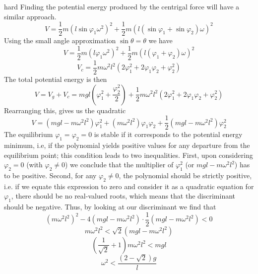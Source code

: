 \begin{solution}{hard}
Finding the potential energy produced by the centrigal force will have a similar approach.
\[V=\frac{1}{2}m(l\sin\varphi_1\omega^2)^2+\frac{1}{2}m(l(\sin\varphi_1+\sin\varphi_2)\omega)^2\]
Using the small angle approximation $\sin\theta=\theta$ we have
\[V=\frac{1}{2}m(l\varphi_1\omega^2)^2+\frac{1}{2}m(l(\varphi_1+\varphi_2)\omega)^2\]
\[V_c=\frac{1}{2}m\omega^2l^2(2\varphi_1^2+2\varphi_1\varphi_2+\varphi_2^2)\]
The total potential energy is then 
\[V = V_g + V_c = mgl\left(\varphi_1^2+\frac{\varphi_2^2}{2}\right) + \frac{1}{2}m\omega^2l^2(2\varphi_1^2+2\varphi_1\varphi_2+\varphi_2^2)\]
Rearranging this, gives us the quadratic
\[V = (mgl - m\omega^2 l^2)\varphi_1^2 + (m\omega^2 l^2)\varphi_1\varphi_2 + \frac{1}{2}(mgl - m\omega^2 l^2)\varphi_2^2\]
The equilibrium $\varphi_1 = \varphi_2 = 0$ is stable if it corresponds to the potential energy minimum, i.e, if the polynomial yields positive values for any departure from the equilibrium point; this condition leads to two inequalities. First, upon considering $\varphi_2 = 0$ (with $\varphi_2 \neq 0$) we conclude that the multiplier of $\varphi_1^2$ (or $mgl - m\omega^2 l^2$) has to be positive. Second, for any $\varphi_2 \neq 0$, the polynomial should be strictly positive, i.e. if we equate this expression to zero and consider it as a quadratic equation for $\varphi_1$, there should be no real-valued roots, which means that the discriminant should be negative. Thus, by looking at our discriminant we find that 
\[
(m\omega^2 l^2)^2 - 4(mgl - m\omega^2 l^2)\cdot \frac{1}{2}(mgl - m\omega^2 l^2) < 0\]
\[
m\omega^2 l^2 < \sqrt{2}(mgl - m\omega^2 l^2)\]
\[
\left(\frac{1}{\sqrt{2}} + 1\right)m\omega^2 l^2 < mgl\]
\[\boxed{\omega^2 < \frac{(2 - \sqrt{2})g}{l}}\]
\end{solution}
